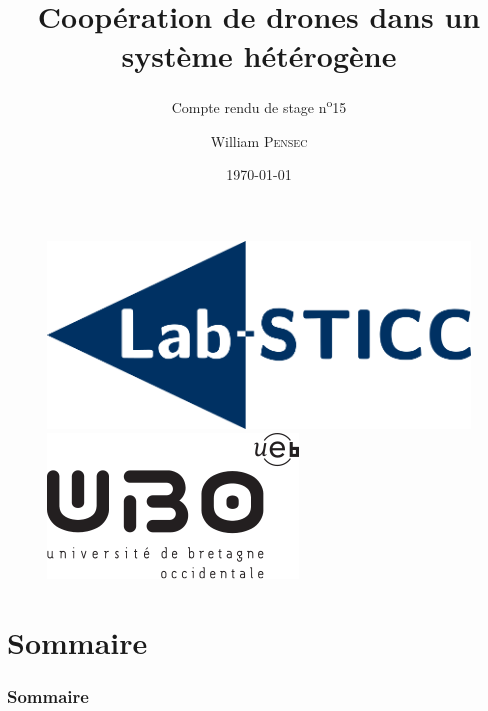 \documentclass[12pt]{beamer}
\title[Compte rendu de stage n\textsuperscript{o}15]{Coopération de drones dans un système hétérogène}
\subtitle{Compte rendu de stage n\textsuperscript{o}15}
\author{William \textsc{Pensec}}
\institute[Lab-STICC]{Lab-Sticc}
\date{\today}
\begin{document}
	\begin{frame}
		\begin{titlepage}
			\begin{figure}[H]
				\centering
				\includegraphics[scale=.15]{labsticc.png}
				\hspace{3cm}
				\includegraphics[scale=.3]{ubo.png}
			\end{figure}
		\end{titlepage}
	\end{frame}
	
	\section*{Sommaire}
	\begin{frame}
		\frametitle{Sommaire}
		\begin{center}
			\tableofcontents
		\end{center}
	\end{frame}
\end{document}
